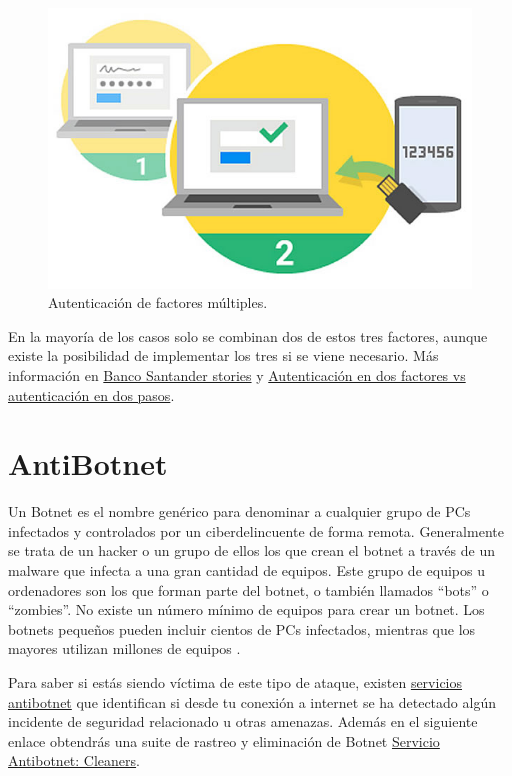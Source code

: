 \documentclass[
  a4paper,
  openany]{book}
\begin{document}
\begin{figure}

{\centering \includegraphics[width=0.5\linewidth]{images/autenticación-factor-múltiple} 

}

\caption{Autenticación de factores múltiples.}\label{fig:unnamed-chunk-14}
\end{figure}

En la mayoría de los casos solo se combinan dos de estos tres factores, aunque existe la posibilidad de implementar los tres si se viene necesario. Más información en \href{https://www.santander.com/es/stories/pon-una-capa-extra-de-seguridad-online-con-la-autenticacion-multifactor}{Banco Santander stories} y \href{https://protegermipc.net/2016/03/18/autenticacion-en-dos-factores-vs-autenticacion-en-dos-pasos/}{Autenticación en dos factores vs autenticación en dos pasos}.

\hypertarget{antibotnet}{%
\section{AntiBotnet}\label{antibotnet}}

Un Botnet es el nombre genérico para denominar a cualquier grupo de PCs infectados y controlados por un ciberdelincuente de forma remota. Generalmente se trata de un hacker o un grupo de ellos los que crean el botnet a través de un malware que infecta a una gran cantidad de equipos. Este grupo de equipos u ordenadores son los que forman parte del botnet, o también llamados ``bots'' o ``zombies''. No existe un número mínimo de equipos para crear un botnet. Los botnets pequeños pueden incluir cientos de PCs infectados, mientras que los mayores utilizan millones de equipos \citep{INCI-botnet}.

Para saber si estás siendo víctima de este tipo de ataque, existen \href{https://www.incibe.es/ciudadania/herramientas/servicio-antibotnet/}{servicios antibotnet} que identifican si desde tu conexión a internet se ha detectado algún incidente de seguridad relacionado u otras amenazas. Además en el siguiente enlace obtendrás una suite de rastreo y eliminación de Botnet \href{https://www.incibe.es/ciudadania/servicio-antibotnet/cleaners}{Servicio Antibotnet: Cleaners}.
\end{document}
